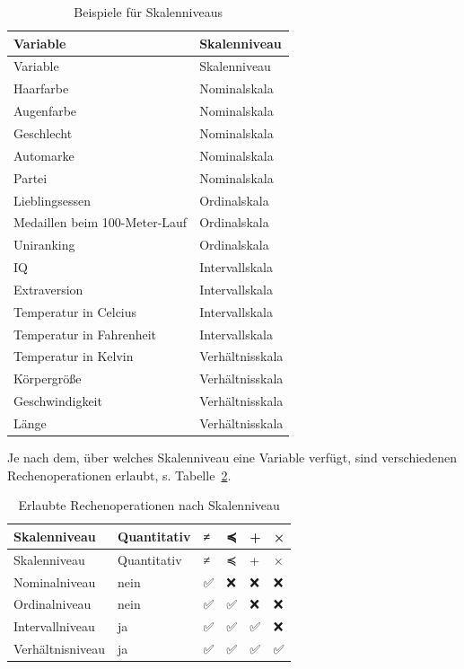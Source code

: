 \documentclass[
  a4paper,
  DIV=11]{scrreprt}
\theoremstyle{definition}
\theoremstyle{definition}
\theoremstyle{remark}
\begin{document}
\hypertarget{tbl-skalen-bsps}{}
\begin{longtable}[]{@{}ll@{}}
\caption{\label{tbl-skalen-bsps}Beispiele für
Skalenniveaus}\tabularnewline
\toprule()
Variable & Skalenniveau \\
\midrule()
\endfirsthead
\toprule()
Variable & Skalenniveau \\
\midrule()
\endhead
Haarfarbe & Nominalskala \\
Augenfarbe & Nominalskala \\
Geschlecht & Nominalskala \\
Automarke & Nominalskala \\
Partei & Nominalskala \\
Lieblingsessen & Ordinalskala \\
Medaillen beim 100-Meter-Lauf & Ordinalskala \\
Uniranking & Ordinalskala \\
IQ & Intervallskala \\
Extraversion & Intervallskala \\
Temperatur in Celcius & Intervallskala \\
Temperatur in Fahrenheit & Intervallskala \\
Temperatur in Kelvin & Verhältnisskala \\
Körpergröße & Verhältnisskala \\
Geschwindigkeit & Verhältnisskala \\
Länge & Verhältnisskala \\
\bottomrule()
\end{longtable}

Je nach dem, über welches Skalenniveau eine Variable verfügt, sind
verschiedenen Rechenoperationen erlaubt, s.
Tabelle~\ref{tbl-skalenniveaus}.

\hypertarget{tbl-skalenniveaus}{}
\begin{longtable}[]{@{}llllll@{}}
\caption{\label{tbl-skalenniveaus}Erlaubte Rechenoperationen nach
Skalenniveau}\tabularnewline
\toprule()
Skalenniveau & Quantitativ & ≠ & ≼ & + & × \\
\midrule()
\endfirsthead
\toprule()
Skalenniveau & Quantitativ & ≠ & ≼ & + & × \\
\midrule()
\endhead
Nominalniveau & nein & ✅ & ❌ & ❌ & ❌ \\
Ordinalniveau & nein & ✅ & ✅ & ❌ & ❌ \\
Intervallniveau & ja & ✅ & ✅ & ✅ & ❌ \\
Verhältnisniveau & ja & ✅ & ✅ & ✅ & ✅ \\
\bottomrule()
\end{longtable}
\end{document}
